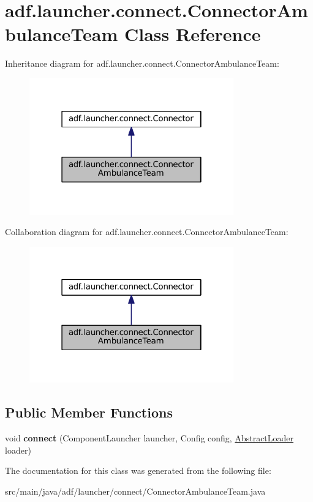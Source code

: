 \hypertarget{classadf_1_1launcher_1_1connect_1_1ConnectorAmbulanceTeam}{}\section{adf.\+launcher.\+connect.\+Connector\+Ambulance\+Team Class Reference}
\label{classadf_1_1launcher_1_1connect_1_1ConnectorAmbulanceTeam}


Inheritance diagram for adf.\+launcher.\+connect.\+Connector\+Ambulance\+Team\+:
\nopagebreak
\begin{figure}[H]
\begin{center}
\leavevmode
\includegraphics[width=250pt]{classadf_1_1launcher_1_1connect_1_1ConnectorAmbulanceTeam__inherit__graph}
\end{center}
\end{figure}


Collaboration diagram for adf.\+launcher.\+connect.\+Connector\+Ambulance\+Team\+:
\nopagebreak
\begin{figure}[H]
\begin{center}
\leavevmode
\includegraphics[width=250pt]{classadf_1_1launcher_1_1connect_1_1ConnectorAmbulanceTeam__coll__graph}
\end{center}
\end{figure}
\subsection*{Public Member Functions}
\begin{DoxyCompactItemize}
\item 
\hypertarget{classadf_1_1launcher_1_1connect_1_1ConnectorAmbulanceTeam_ab8d91536ca43dc890644f58e8a8c45ef}{}\label{classadf_1_1launcher_1_1connect_1_1ConnectorAmbulanceTeam_ab8d91536ca43dc890644f58e8a8c45ef} 
void {\bfseries connect} (Component\+Launcher launcher, Config config, \hyperlink{classadf_1_1component_1_1AbstractLoader}{Abstract\+Loader} loader)
\end{DoxyCompactItemize}


The documentation for this class was generated from the following file\+:\begin{DoxyCompactItemize}
\item 
src/main/java/adf/launcher/connect/Connector\+Ambulance\+Team.\+java\end{DoxyCompactItemize}
